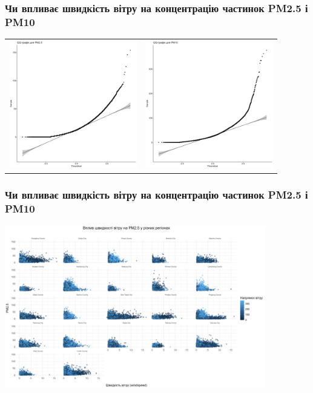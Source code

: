 \documentclass{beamer}
\begin{document}
\begin{frame}
  \frametitle{Чи впливає швидкість вітру на концентрацію частинок PM2.5 і PM10}

  \begin{tabular}{cc}
    \includegraphics[height=2.2in]{plots/question1/qq_pm2_5.png} &
    \includegraphics[height=2.2in]{plots/question1/qq_pm10.png}
  \end{tabular}

  \begin{center}

  \end{center}
\end{frame}

\begin{frame}
  \frametitle{Чи впливає швидкість вітру на концентрацію частинок PM2.5 і PM10}

  \begin{center}
    \includegraphics[height=2.8in]{plots/question1/scatter_pm2_5_region.png}
  \end{center}
\end{frame}
\end{document}
